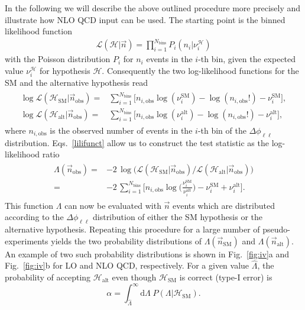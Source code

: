 \documentclass[preprint]{JHEP3} %
\newcommand{\SM}{\mathrm{SM}}
\newcommand{\alt}{\mathrm{alt}}
\def\hLambda {\hat{\Lambda}}
\def\HSM{\mathcal{H}_{\mathrm{SM}}}
\def\Halt{\mathcal{H}_{\mathrm{alt}}}
\newcommand{\be}{\begin{eqnarray}}
\newcommand{\ee}{\end{eqnarray}}
\begin{document}
In the following we will describe the above outlined procedure more precisely and illustrate how NLO QCD input can be used.
The starting point is the binned likelihood function 
\be
\label{lili}
   \mathcal{L}(\mathcal{H}|\vec{n}) = \prod_{i=1}^{N_\mathrm{bins}} P_i(n_i|\nu_{i}^\mathcal{H})
\ee
with the Poisson distribution $P_i$ for $n_i$ events in the $i$-th bin, given the expected value $\nu_{i}^\mathcal{H}$ for hypothesis $\mathcal{H}$.
Consequently the two log-likelihood functions for the SM and the alternative hypothesis read
\be
\label{lilifunct}
\begin{split}
  \log\mathcal{L}(\HSM |\vec{n}_\mathrm{obs})  =& \sum_{i=1}^{N_\mathrm{bins}} \bigl[ n_{i,\mathrm{obs}}\log(\nu_i^{\SM}) -\log(n_{i,\mathrm{obs}}!) -\nu_i^{\SM}  \bigr], \\
  \log\mathcal{L}(\Halt|\vec{n}_\mathrm{obs})  =& \sum_{i=1}^{N_\mathrm{bins}} \bigl[ n_{i,\mathrm{obs}}\log(\nu_i^{\alt})-\log(n_{i,\mathrm{obs}}!) -\nu_i^{\alt} \bigr],
\end{split}
\ee
where $n_{i,\mathrm{obs}}$ is the observed number of events in the $i$-th bin of the $\Delta \phi_{\ell\ell}$ distribution. 
Eqs.~\ref{lilifunct} allow us to construct the test statistic as the log-likelihood ratio
\be
\begin{split}
  \Lambda(\vec{n}_\mathrm{obs}) =& -2 \, \log \biggl( \mathcal{L}(\HSM |\vec{n}_\mathrm{obs})  \big/ \mathcal{L}(\Halt|\vec{n}_\mathrm{obs})  \biggr)  \\
                                =& -2\, \sum_{i=1}^{N_\mathrm{bins}} \biggl[ n_{i,\mathrm{obs}}\log \biggl( \frac{\nu_i^{\SM}}{\nu_i^{\alt}} \biggr) -\nu_i^{\SM} + \nu_i^{\alt} \biggr]. 
\end{split}
\ee
This function $\Lambda$ can now be evaluated with $\vec{n}$ events which are distributed according to the $\Delta \phi_{\ell\ell}$ distribution of either 
the SM hypothesis or the alternative hypothesis. 
Repeating this procedure for a large number of pseudo-experiments yields the two probability distributions of $\Lambda(\vec{n}_\mathrm{SM})$ and $\Lambda(\vec{n}_\mathrm{alt})$.
An example of two such probability distributions is shown in Fig.~\ref{fig:iv}a and Fig.~\ref{fig:iv}b for LO and NLO QCD, respectively. 
For a given value $\hat{\Lambda}$, the probability of accepting $\mathcal{H}_{\alt}$ even though $\mathcal{H}_{\SM}$ is correct (type-I error) is
\begin{equation}
    \alpha = \int_{\hLambda}^{\infty} \mathrm{d}\Lambda \; P(\Lambda | {\HSM}).
\end{equation}
\end{document}
